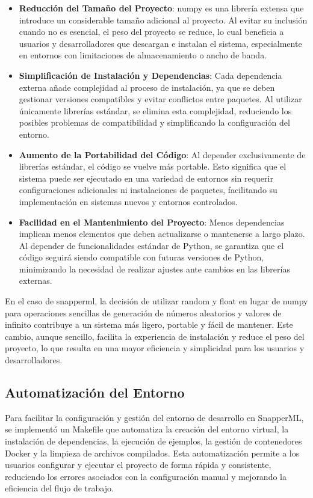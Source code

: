 \begin{itemize} \item \textbf{Reducción del Tamaño del Proyecto}: numpy es una librería extensa que introduce un considerable tamaño adicional al proyecto. Al evitar su inclusión cuando no es esencial, el peso del proyecto se reduce, lo cual beneficia a usuarios y desarrolladores que descargan e instalan el sistema, especialmente en entornos con limitaciones de almacenamiento o ancho de banda.

    \item \textbf{Simplificación de Instalación y Dependencias}: Cada dependencia externa añade complejidad al proceso de instalación, ya que se deben gestionar versiones compatibles y evitar conflictos entre paquetes. Al utilizar únicamente librerías estándar, se elimina esta complejidad, reduciendo los posibles problemas de compatibilidad y simplificando la configuración del entorno.

    \item \textbf{Aumento de la Portabilidad del Código}: Al depender exclusivamente de librerías estándar, el código se vuelve más portable. Esto significa que el sistema puede ser ejecutado en una variedad de entornos sin requerir configuraciones adicionales ni instalaciones de paquetes, facilitando su implementación en sistemas nuevos y entornos controlados.

    \item \textbf{Facilidad en el Mantenimiento del Proyecto}: Menos dependencias implican menos elementos que deben actualizarse o mantenerse a largo plazo. Al depender de funcionalidades estándar de Python, se garantiza que el código seguirá siendo compatible con futuras versiones de Python, minimizando la necesidad de realizar ajustes ante cambios en las librerías externas.

\end{itemize}

En el caso de \Gls{snapperml}, la decisión de utilizar random y float en lugar de numpy para operaciones sencillas de generación de números aleatorios y valores de infinito contribuye a un sistema más ligero, portable y fácil de mantener. Este cambio, aunque sencillo, facilita la experiencia de instalación y reduce el peso del proyecto, lo que resulta en una mayor eficiencia y simplicidad para los usuarios y desarrolladores.

\subsection{Automatización del Entorno}
Para facilitar la configuración y gestión del entorno de desarrollo en SnapperML, se implementó un Makefile que automatiza la creación del entorno virtual, la instalación de dependencias, la ejecución de ejemplos, la gestión de contenedores Docker y la limpieza de archivos compilados. Esta automatización permite a los usuarios configurar y ejecutar el proyecto de forma rápida y consistente, reduciendo los errores asociados con la configuración manual y mejorando la eficiencia del flujo de trabajo.

